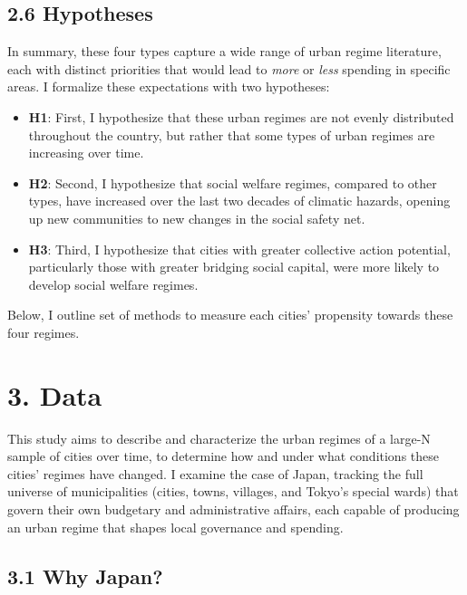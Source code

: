 \documentclass[preprint, 3p,
authoryear]{elsarticle} %
\begin{document}
\hypertarget{hypotheses}{%
\subsection{2.6 Hypotheses}\label{hypotheses}}

In summary, these four types capture a wide range of urban regime
literature, each with distinct priorities that would lead to \emph{more}
or \emph{less} spending in specific areas. I formalize these
expectations with two hypotheses:

\begin{itemize}
\item
  \textbf{H1}: First, I hypothesize that these urban regimes are not
  evenly distributed throughout the country, but rather that some types
  of urban regimes are increasing over time.
\item
  \textbf{H2}: Second, I hypothesize that social welfare regimes,
  compared to other types, have increased over the last two decades of
  climatic hazards, opening up new communities to new changes in the
  social safety net.
\item
  \textbf{H3}: Third, I hypothesize that cities with greater collective
  action potential, particularly those with greater bridging social
  capital, were more likely to develop social welfare regimes.
\end{itemize}

Below, I outline set of methods to measure each cities' propensity
towards these four regimes.

\hypertarget{data}{%
\section{3. Data}\label{data}}

This study aims to describe and characterize the urban regimes of a
large-N sample of cities over time, to determine how and under what
conditions these cities' regimes have changed. I examine the case of
Japan, tracking the full universe of municipalities (cities, towns,
villages, and Tokyo's special wards) that govern their own budgetary and
administrative affairs, each capable of producing an urban regime that
shapes local governance and spending.

\hypertarget{why-japan}{%
\subsection{3.1 Why Japan?}\label{why-japan}}
\end{document}
